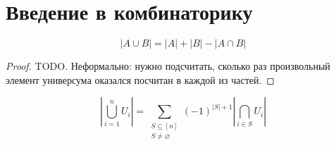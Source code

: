 \chapter{Введение в комбинаторику}

\begin{thm}\[
  |A\cup B| = |A| + |B| - |A\cap B|
\]\end{thm}
\begin{proof}
  TODO. Неформально: нужно подсчитать, сколько раз произвольный элемент
  универсума оказался посчитан в каждой из частей.
\end{proof}

\begin{thm}\[
  \left|\bigcup_{i=1}^n U_i\right|
  =\sum_{\substack{S\subseteq[n]\\ S\ne\varnothing}}
  (-1)^{|S|+1}\left|\bigcap_{i\in S}U_i\right|
\]\end{thm}
